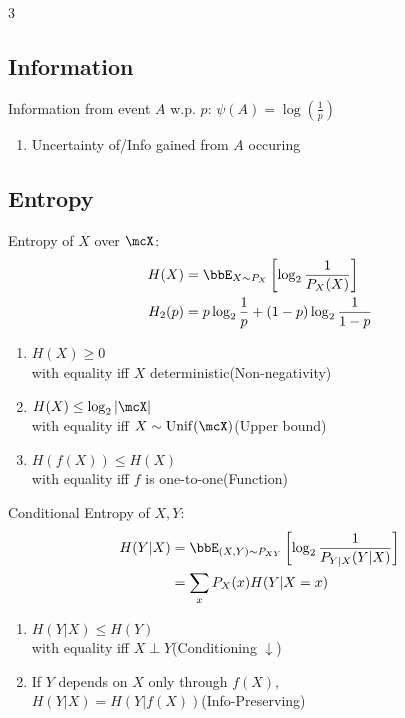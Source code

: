 \documentclass[12pt, a4paper]{article}
\begin{document}
\begin{multicols*}{3}
\subsection{Information}
Information from event $A$ w.p. $p$: $\psi(A) = \log(\frac{1}{p})$
\begin{enumerate}[\roman*.]
  \item Uncertainty of/Info gained from $A$ occuring
\end{enumerate}

\subsection{Entropy}
Entropy of $X$ over $\mcX$:
\begin{align*}
  H(X) &= \E_{X\sim P_X}\left[\log_2 \frac{1}{P_X(X)}\right]\\ 
  H_2(p) &= p\log_2\frac1p + (1-p)\log_2\frac1{1-p}
\end{align*}
\begin{enumerate}[\roman*.]
  \item $H(X) \geq 0$\\with equality iff $X$ deterministic\hfill(Non-negativity)
  \item $H(X) \leq \log_2|\mcX|$\\with equality iff $X\sim \Unif(\mcX)$\hfill(Upper bound)
  \item $H(f(X)) \leq H(X)$\\with equality iff $f$ is one-to-one\hfill(Function)
\end{enumerate}

Conditional Entropy of $X,Y$:
\begin{align*}
  H(Y|X) &= \E_{(X,Y)\sim P_{XY}}\left[\log_2 \frac{1}{P_{Y|X}(Y|X)}\right]\\
         &=\sum_x P_X(x)H(Y|X=x) 
\end{align*}
\begin{enumerate}
  \item $H(Y|X)\le H(Y)$\\with equality iff $X\perp Y$\hfill(Conditioning $\downarrow$)
  \item If $Y$ depends on $X$ only through $f(X)$,\\$H(Y|X) = H(Y|f(X))$\hfill(Info-Preserving)
\end{enumerate}


\end{multicols*}
\end{document}

